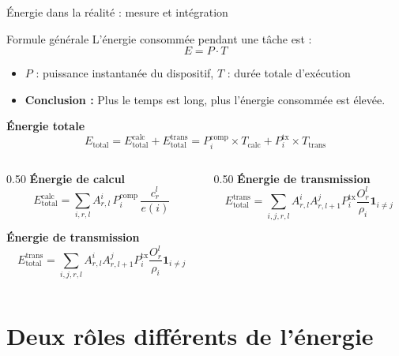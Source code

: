 \documentclass[10pt,aspectratio=169]{beamer}
\begin{document}
\begin{frame}{Énergie dans la réalité : mesure et intégration}
\begin{block}{Formule générale}
    L'énergie consommée pendant une tâche est :
    \begin{equation*}
        E = P \cdot T
    \end{equation*}
    \begin{itemize}
        \item $P$ : puissance instantanée du dispositif, $T$ : durée totale d'exécution
        \item \textbf{Conclusion :} Plus le temps est long, plus l'énergie consommée est élevée.
    \end{itemize}
\end{block}

\centering
      \large\textbf{Énergie totale}
      \[
      E_{\text{total}} = E^{\text{calc}}_{\text{total}} + E^{\text{trans}}_{\text{total}} = P_i^{\text{comp}} \times T_{\text{calc}} + P_i^{\text{tx}} \times T_{\text{trans}} 
      \]

\begin{columns}[T]
    \begin{column}{0.50\textwidth}
        \centering
        \textbf{Énergie de calcul}
        \[
        E^{\text{calc}}_{\text{total}} = \sum_{i,r,l} A^i_{r,l} \, P_i^{\text{comp}} \, \frac{c^l_r}{e(i)}
        \]

        \centering
        \textbf{Énergie de transmission}
        \[
        E^{\text{trans}}_{\text{total}} = \sum_{i,j,r,l} A^i_{r,l} A^j_{r,l+1} P_i^{\text{tx}} \frac{O^l_r}{\rho_i} \mathbf{1}_{i\neq j}
        \]
    \end{column}
    
    \begin{column}{0.50\textwidth}
        \centering
        \textbf{Énergie de transmission}
        \[
        E^{\text{trans}}_{\text{total}} = \sum_{i,j,r,l} A^i_{r,l} A^j_{r,l+1} P_i^{\text{tx}} \frac{O^l_r}{\rho_i} \mathbf{1}_{i\neq j}
        \]
    \end{column}
\end{columns}

\end{frame}

\section{Deux rôles différents de l’énergie}
\end{document}
